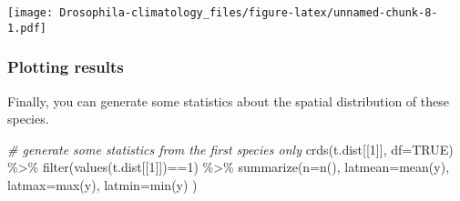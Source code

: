 \documentclass[
]{article}
\newenvironment{Shaded}{\begin{snugshade}}{\end{snugshade}}
\newcommand{\AttributeTok}[1]{\textcolor[rgb]{0.77,0.63,0.00}{#1}}
\newcommand{\CommentTok}[1]{\textcolor[rgb]{0.56,0.35,0.01}{\textit{#1}}}
\newcommand{\ConstantTok}[1]{\textcolor[rgb]{0.00,0.00,0.00}{#1}}
\newcommand{\DecValTok}[1]{\textcolor[rgb]{0.00,0.00,0.81}{#1}}
\newcommand{\FloatTok}[1]{\textcolor[rgb]{0.00,0.00,0.81}{#1}}
\newcommand{\FunctionTok}[1]{\textcolor[rgb]{0.00,0.00,0.00}{#1}}
\newcommand{\NormalTok}[1]{#1}
\newcommand{\OtherTok}[1]{\textcolor[rgb]{0.56,0.35,0.01}{#1}}
\newcommand{\SpecialCharTok}[1]{\textcolor[rgb]{0.00,0.00,0.00}{#1}}
\newcommand{\StringTok}[1]{\textcolor[rgb]{0.31,0.60,0.02}{#1}}
\begin{document}
\begin{Shaded}
\end{Shaded}

\texttt{[image: Drosophila-climatology\_files/figure-latex/unnamed-chunk-8-1.pdf]}

\hypertarget{plotting-results}{%
\subsubsection{Plotting results}\label{plotting-results}}

Finally, you can generate some statistics about the spatial distribution
of these species.

\begin{Shaded}
\begin{Highlighting}[]
\CommentTok{\# generate some statistics from the first species only}
\FunctionTok{crds}\NormalTok{(t.dist[[}\DecValTok{1}\NormalTok{]], }\AttributeTok{df=}\ConstantTok{TRUE}\NormalTok{) }\SpecialCharTok{\%\textgreater{}\%} \FunctionTok{filter}\NormalTok{(}\FunctionTok{values}\NormalTok{(t.dist[[}\DecValTok{1}\NormalTok{]])}\SpecialCharTok{==}\DecValTok{1}\NormalTok{) }\SpecialCharTok{\%\textgreater{}\%} 
  \FunctionTok{summarize}\NormalTok{(}\AttributeTok{n=}\FunctionTok{n}\NormalTok{(), }\AttributeTok{latmean=}\FunctionTok{mean}\NormalTok{(y), }\AttributeTok{latmax=}\FunctionTok{max}\NormalTok{(y), }\AttributeTok{latmin=}\FunctionTok{min}\NormalTok{(y) )}
\end{Highlighting}
\end{Shaded}
\end{document}

